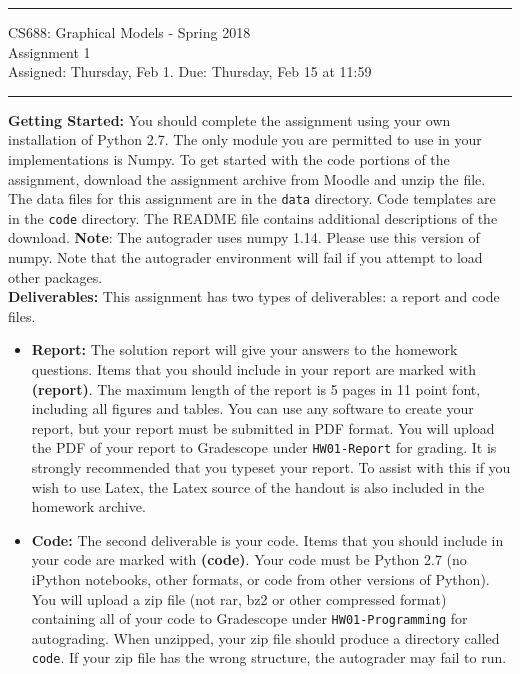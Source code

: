 \documentclass[11pt]{article}
\begin{document}
{\centering
  \rule{6.3in}{2pt}
  \vspace{1em}
  {\Large
    CS688: Graphical Models - Spring 2018\\
    Assignment 1\\
  }
  \vspace{1em}
  Assigned: Thursday, Feb 1. Due: Thursday, Feb 15 at 11:59 \\
  \vspace{0.1em}
  \rule{6.3in}{1.5pt}
}
\vspace{1pc}

\textbf{Getting Started:} You should complete the assignment using your own installation of Python 2.7. The only module you are permitted to use in your implementations is Numpy. To get started with the code portions of the assignment, download the assignment archive from Moodle and unzip the file. The data files for this assignment are in the \texttt{data} directory. Code templates are in the \texttt{code} directory. The README file contains additional descriptions of the download.  \textbf{Note}: The autograder uses numpy 1.14. Please use this version of numpy. Note that the autograder environment will fail if you attempt to load other packages.\\

\textbf{Deliverables:} This assignment has two types of deliverables: a report and code files.

\begin{itemize}
\item \textbf{Report: } The solution report will give your answers to the homework questions. Items that you should include in your report are marked with \textbf{(report)}. The maximum length of the report is 5 pages in 11 point font, including all figures and tables. You can use any software to create your report, but your report must be submitted in PDF format. You will upload the PDF of your report to Gradescope under \verb|HW01-Report| for grading. It is strongly recommended that you typeset your report. To assist with this if you wish to use Latex, the Latex source of the handout is also included in the homework archive.

\item \textbf{Code: } The second deliverable is your code. Items that you should include in your code are marked with \textbf{(code)}.  Your code must be Python 2.7 (no iPython notebooks, other formats, or code from other versions of Python). You will upload a zip file (not rar, bz2 or other compressed format) containing all of your code to Gradescope under \verb|HW01-Programming| for autograding.  When unzipped, your zip file should produce a directory called \verb|code|. If your zip file has the wrong structure, the autograder may fail to run.
\end{itemize}
\vspace{0.5em}
\end{document}
